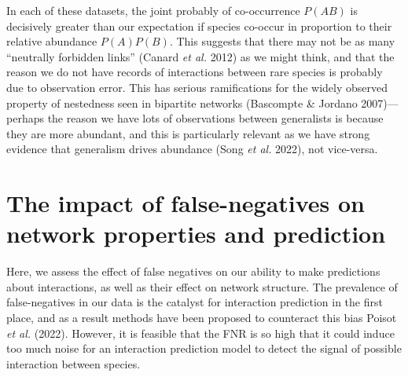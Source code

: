 \documentclass[11pt]{article}
\begin{document}
In each of these datasets, the joint probably of co-occurrence \(P(AB)\)
is decisively greater than our expectation if species co-occur in
proportion to their relative abundance \(P(A)P(B)\). This suggests that
there may not be as many ``neutrally forbidden links'' (Canard \emph{et
al.} 2012) as we might think, and that the reason we do not have records
of interactions between rare species is probably due to observation
error. This has serious ramifications for the widely observed property
of nestedness seen in bipartite networks (Bascompte \& Jordano
2007)---perhaps the reason we have lots of observations between
generalists is because they are more abundant, and this is particularly
relevant as we have strong evidence that generalism drives abundance
(Song \emph{et al.} 2022), not vice-versa.

\hypertarget{the-impact-of-false-negatives-on-network-properties-and-prediction}{%
\section{The impact of false-negatives on network properties and
prediction}\label{the-impact-of-false-negatives-on-network-properties-and-prediction}}

Here, we assess the effect of false negatives on our ability to make
predictions about interactions, as well as their effect on network
structure. The prevalence of false-negatives in our data is the catalyst
for interaction prediction in the first place, and as a result methods
have been proposed to counteract this bias Poisot \emph{et al.} (2022).
However, it is feasible that the FNR is so high that it could induce too
much noise for an interaction prediction model to detect the signal of
possible interaction between species.
\end{document}
